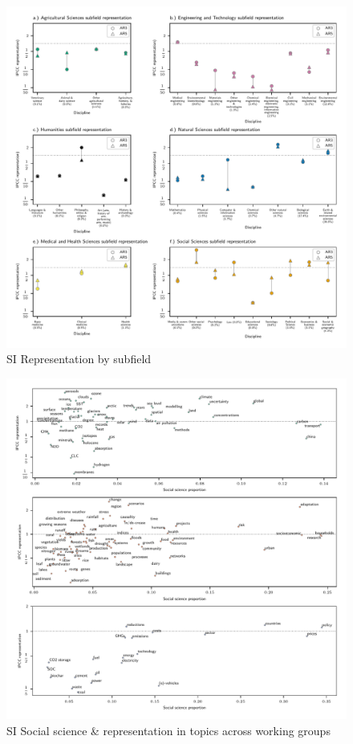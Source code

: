 \documentclass{article}
\begin{document}
	\begin{figure}
		\begin{center}
			\includegraphics[width=1\linewidth]{../plots_pub/ipcc_rep_wcs_simplified.pdf}
			\caption{SI Representation by subfield}
			\label{subfield}
		\end{center}
	\end{figure}
	
	\begin{figure}
		\begin{center}
			\includegraphics[width=1\linewidth]{../plots_pub/wgs_socsci.pdf}
			\caption{SI Social science \& representation in topics across working groups}
			\label{socsci-wgs}
		\end{center}
	\end{figure}
	
\end{document}
